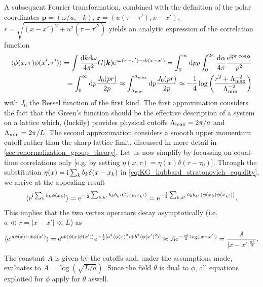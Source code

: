 A subsequent Fourier transformation, combined with the definition of the polar coordinates ${\bm p}=(\omega/u,-k)$, ${\bm r} = (u(\tau-\tau'), x-x')$, $r = \sqrt{(x-x')^2+u^2(\tau-\tau'^2)}$ yields an analytic expression of the correlation function
\begin{align}
    \braket{\phi(x,\tau)\phi(x',\tau')}
    = \int\frac{\mathrm d k\mathrm d\omega}{4\pi^2}G({\bm k})\mathrm e^{\mathrm i\omega(\tau-\tau')-\mathrm i k(x-x')}
    = \int_0^\infty\mathrm d pp\int_0^{2\pi}\frac{\mathrm d\alpha}{4\pi}\frac{\mathrm e^{\mathrm i pr\cos\alpha}}{p^2}
    \\
    = \int_0^\infty\mathrm d p\frac{J_0(pr)}{2p}
    \approx
    \int_{\Lambda_{\rm min}}^{\Lambda_{\rm max}}\mathrm d p \frac{J_0(pr)}{2p}
    \approx
    -\frac14\log\left( \frac{r^2+\Lambda_{\rm max}^{-2}}{\Lambda_{\rm min}^{-2}} \right)
    \label{eq:kg_correlations_approximation}
\end{align}
with $J_0$ the Bessel function of the first kind.
The first approximation considers the fact that the Green's function should be the effective description of a system on a lattice which, (luckily) provides physical cutoffs $\Lambda_{\rm max} = 2\pi/a$ and $\Lambda_{\rm min} = 2\pi/L$.
The second approximation considers a smooth upper momentum cutoff rather than the sharp lattice limit, discussed in more detail in \cref{sec:renormalization_group_theory}.
Let us now simplify by focussing on equal-time correlations only [e.g. by setting $\eta(x,\tau)=\eta(x)\delta(\tau-\tau_0)$].
Through the substitution $\eta(x) = \mathrm i\sum_{k}b_k\delta(x-x_k)$ in \cref{eq:KG_hubbard_stratonovich_equality}, we arrive at the appealing result
\begin{align}
    \braket{\mathrm e^{\mathrm i\sum_kb_k\phi(x_k)}} = \mathrm e^{-\frac12\sum_{k,k'}b_kb_{k'}G(x_k,x_{k'})} = \mathrm e^{-\frac12\sum_{k,k'}b_kb_{k'}\braket{\phi(x_k)\phi(x_{k'})}}.
    \label{eq:expectation_value_exponential_fields}
\end{align}
This implies that the two vertex operators decay asymptotically (i.e. $a\ll r=|x-x'|\ll L$) as
\begin{align}
    \braket{\mathrm e^{\mathrm i a\phi(x) - \mathrm i b\phi(x')}}
    = \mathrm e^{ab\braket{\phi(x)\phi(x')}}\mathrm e^{-\frac12[a^2\braket{\phi(x)^2}+b^2\braket{\phi(x')^2}]}
    \approx A\mathrm e^{-\frac{ab}2\log(|x-x'|)}
    = \frac A{|x-x'|^{\frac{ab}2}}.
\end{align}
The constant $A$ is given by the cutoffs and, under the assumptions made, evaluates to $A = \log(\sqrt{L/a})$.
Since the field $\theta$ is dual to $\phi$, all equations exploited for $\phi$ apply for $\theta$ aswell.

